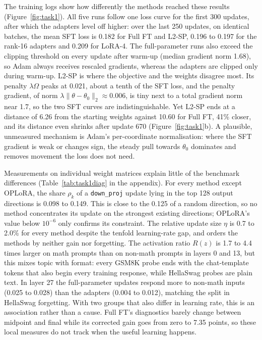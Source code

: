 The training logs show how differently the methods reached these results (Figure~\ref{fig:task1}). All five runs follow one loss curve for the first 300 updates, after which the adapters level off higher: over the last 250 updates, on identical batches, the mean SFT loss is 0.182 for Full FT and L2-SP, 0.196 to 0.197 for the rank-16 adapters and 0.209 for LoRA-4. The full-parameter runs also exceed the clipping threshold on every update after warm-up (median gradient norm 1.68), so Adam always receives rescaled gradients, whereas the adapters are clipped only during warm-up. L2-SP is where the objective and the weights disagree most. Its penalty $\lambda\Omega$ peaks at 0.021, about a tenth of the SFT loss, and the penalty gradient, of norm $\lambda\|\theta-\theta_0\|_2\approx0.006$, is tiny next to a total gradient norm near 1.7, so the two SFT curves are indistinguishable. Yet L2-SP ends at a distance of 6.26 from the starting weights against 10.60 for Full FT, 41\% closer, and its distance even shrinks after update 670 (Figure~\ref{fig:task1}b). A plausible, unmeasured mechanism is Adam's per-coordinate normalisation: where the SFT gradient is weak or changes sign, the steady pull towards $\theta_0$ dominates and removes movement the loss does not need.

Measurements on individual weight matrices explain little of the benchmark differences (Table~\ref{tab:task1diag} in the appendix). For every method except OPLoRA, the share $\rho_k$ of a \texttt{down\_proj} update lying in the top 128 output directions is 0.098 to 0.149. This is close to the 0.125 of a random direction, so no method concentrates its update on the strongest existing directions; OPLoRA's value below $10^{-6}$ only confirms its constraint. The relative update size $\eta$ is 0.7 to 2.0\% for every method despite the tenfold learning-rate gap, and orders the methods by neither gain nor forgetting. The activation ratio $R(z)$ is 1.7 to 4.4 times larger on math prompts than on non-math prompts in layers 0 and 13, but this mixes topic with format: every GSM8K probe ends with the chat-template tokens that also begin every training response, while HellaSwag probes are plain text. In layer 27 the full-parameter updates respond more to non-math inputs (0.025 to 0.028) than the adapters (0.004 to 0.012), matching the split in HellaSwag forgetting. With two groups that also differ in learning rate, this is an association rather than a cause. Full FT's diagnostics barely change between midpoint and final while its corrected gain goes from zero to 7.35 points, so these local measures do not track when the useful learning happens.

